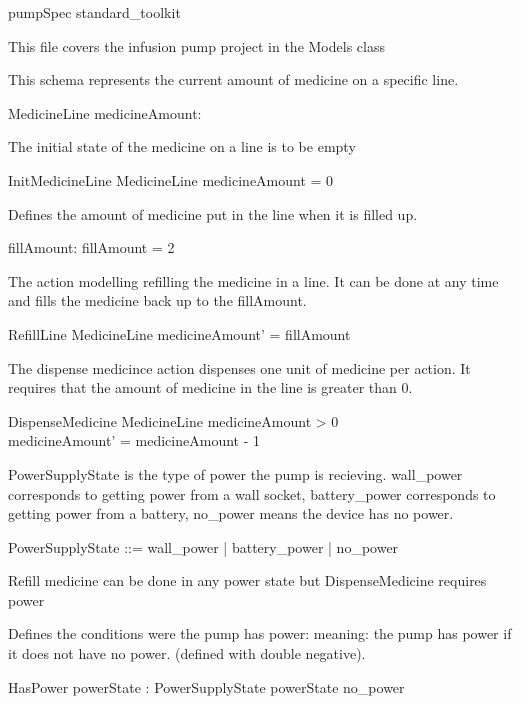 \documentclass{article}
\begin{document}
\begin{zsection}
  \SECTION pumpSpec \parents standard\_toolkit
\end{zsection}

This file covers the infusion pump project in the Models class



This schema represents the current amount of medicine
on a specific line.
\begin{schema}{MedicineLine}
  medicineAmount: \nat
\end{schema}

The initial state of the medicine on a line is to be empty
\begin{schema}{InitMedicineLine}
  MedicineLine
\where
  medicineAmount = 0
\end{schema}

Defines the amount of medicine put in the line
when it is filled up.
\begin{axdef}
  fillAmount: \nat
\where
  fillAmount = 2
\end{axdef}


The action modelling refilling the medicine in a line.
It can be done at any time and fills the medicine
back up to the fillAmount.
\begin{schema}{RefillLine}
  \Delta MedicineLine
\where
  medicineAmount' = fillAmount
\end{schema}

The dispense medicince action dispenses one unit of
medicine per action.  It requires that the amount
of medicine in the line is greater than 0.
\begin{schema}{DispenseMedicine}
  \Delta MedicineLine
\where
  medicineAmount > 0 \\
  medicineAmount' = medicineAmount - 1
\end{schema}

PowerSupplyState is the type of power the pump is recieving.
wall\_power corresponds to getting power from a wall socket,
battery\_power corresponds to getting power from a battery,
no\_power means the device has no power.
\begin{zed}
  PowerSupplyState ::= wall\_power | battery\_power | no\_power
\end{zed}

Refill medicine can be done in any power state but DispenseMedicine
requires power


Defines the conditions were the pump has power:
meaning: the pump has power if it does not have no power.
(defined with double negative).
\begin{schema}{HasPower}
  powerState : PowerSupplyState
\where
  powerState \neq no\_power
\end{schema}
\end{document}
